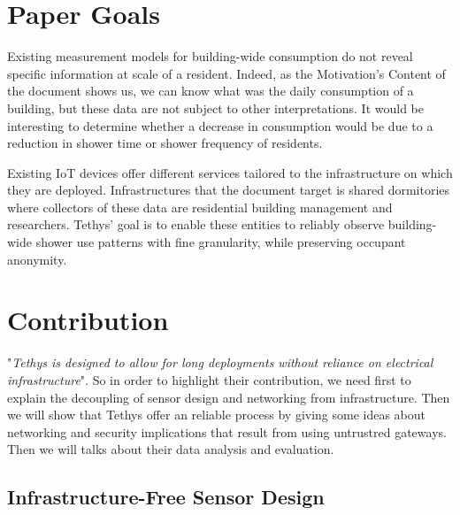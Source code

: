 \documentclass[10pt,journal,compsoc]{IEEEtran}
\begin{document}
\section{Paper Goals}\label{sec:paperGoals}

Existing measurement models for building-wide consumption do not reveal specific information at scale of a resident. Indeed, as the Motivation's Content of the document shows us, we can know what was the daily consumption of a building, but these data are not subject to other interpretations. It would be interesting to determine whether a decrease in consumption would be due to a reduction in shower time or shower frequency of residents. 

Existing IoT devices offer different services tailored to the infrastructure on which they are deployed. Infrastructures that the document target is shared dormitories where collectors of these data are residential building management and researchers. Tethys' goal is to enable these entities to reliably observe building-wide shower use patterns with fine granularity, while preserving occupant anonymity.

\section{Contribution}\label{sec:contribution}
"\emph{Tethys is designed to allow for long deployments without
reliance on electrical infrastructure}"\cite{IEEEhowto:}. So in order to highlight their contribution, we need first to explain the decoupling of sensor design and networking from infrastructure. Then we will show that Tethys offer an reliable process by giving some ideas about networking and security implications that result from using untrustred gateways. Then we will talks about their data analysis and evaluation. 

\subsection{Infrastructure-Free Sensor Design}
\end{document}
